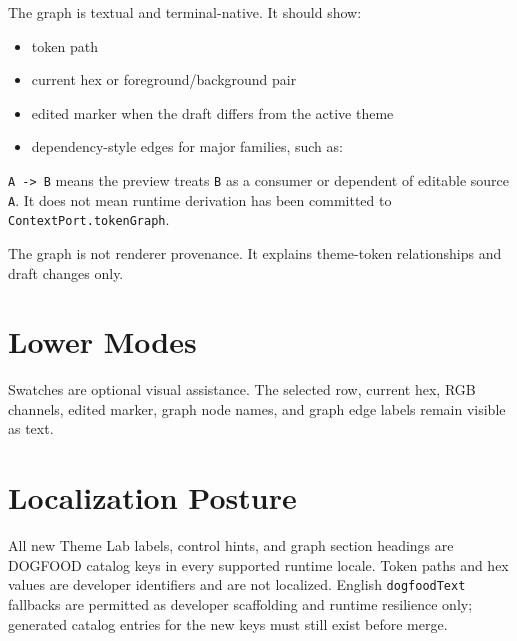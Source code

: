 The graph is textual and terminal-native. It should show:

\begin{itemize}
\tightlist
\item
  token path
\item
  current hex or foreground/background pair
\item
  edited marker when the draft differs from the active theme
\item
  dependency-style edges for major families, such as:
\end{itemize}



\texttt{A\allowbreak{} \allowbreak{}-\allowbreak{}>\allowbreak{} \allowbreak{}B} means the preview treats \texttt{B} as a consumer or dependent of editable source \texttt{A}. It does not mean runtime derivation has been committed to \texttt{C\allowbreak{}o\allowbreak{}n\allowbreak{}t\allowbreak{}e\allowbreak{}x\allowbreak{}t\allowbreak{}P\allowbreak{}o\allowbreak{}r\allowbreak{}t\allowbreak{}.\allowbreak{}t\allowbreak{}o\allowbreak{}k\allowbreak{}e\allowbreak{}n\allowbreak{}G\allowbreak{}r\allowbreak{}a\allowbreak{}p\allowbreak{}h}.

The graph is not renderer provenance. It explains theme-token relationships and draft changes only.

\section{Lower Modes}\label{record-187-lower-modes}

Swatches are optional visual assistance. The selected row, current hex, RGB channels, edited marker, graph node names, and graph edge labels remain visible as text.

\section{Localization Posture}\label{record-187-localization-posture}

All new Theme Lab labels, control hints, and graph section headings are DOGFOOD catalog keys in every supported runtime locale. Token paths and hex values are developer identifiers and are not localized. English \texttt{d\allowbreak{}o\allowbreak{}g\allowbreak{}f\allowbreak{}o\allowbreak{}o\allowbreak{}d\allowbreak{}T\allowbreak{}e\allowbreak{}x\allowbreak{}t} fallbacks are permitted as developer scaffolding and runtime resilience only; generated catalog entries for the new keys must still exist before merge.

